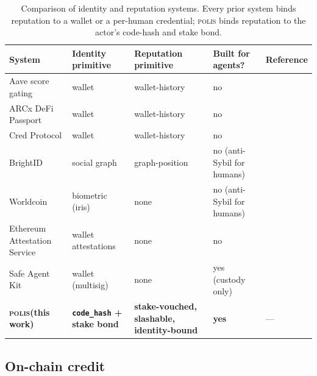 \documentclass[10pt,conference,letterpaper]{IEEEtran}
\theoremstyle{definition}
\newcommand{\polis}{\textsc{polis}\xspace}
\newcommand{\codehash}{\texttt{code\_hash}}
\begin{document}
\begin{table}[!t]
\caption{Comparison of identity and reputation systems. Every prior
system binds reputation to a wallet or a per-human credential; \polis
binds reputation to the actor's code-hash and stake bond.}
\label{tab:related}
\centering
\small
\begin{tabularx}{\textwidth}{lXXXl}
\toprule
\textbf{System} & \textbf{Identity primitive} & \textbf{Reputation primitive} & \textbf{Built for agents?} & \textbf{Reference} \\
\midrule
Aave score gating               & wallet                          & wallet-history                                  & no                              & \cite{aave2020v2}\\
ARCx DeFi Passport              & wallet                          & wallet-history                                  & no                              & \cite{arcx2022}\\
Cred Protocol                   & wallet                          & wallet-history                                  & no                              & \cite{credprotocol2023}\\
BrightID                        & social graph                    & graph-position                                  & no (anti-Sybil for humans)      & \cite{brightid2020}\\
Worldcoin                       & biometric (iris)                & none                                            & no (anti-Sybil for humans)      & \cite{worldcoin2023}\\
Ethereum Attestation Service    & wallet attestations             & none                                            & no                              & \cite{eas2023}\\
Safe Agent Kit                  & wallet (multisig)               & none                                            & yes (custody only)              & \cite{safe2024agentkit}\\
\textbf{\polis (this work)}     & \textbf{\codehash{} + stake bond} & \textbf{stake-vouched, slashable, identity-bound} & \textbf{yes}                  & ---\\
\bottomrule
\end{tabularx}
\end{table}

\subsection{On-chain credit}
\end{document}
